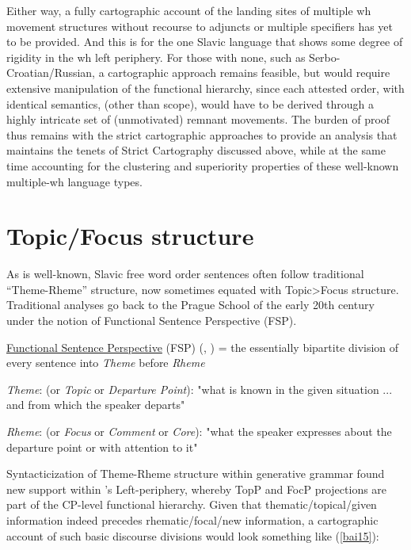 \documentclass[output=paper,colorlinks,citecolor=brown,
]{langscibook}
\begin{document}
Either way, a fully cartographic account of the landing sites of multiple wh movement structures without recourse to adjuncts or multiple specifiers has yet to be provided.  And this is for the one Slavic language that shows some degree of rigidity in the wh left periphery. For those with none, such as Serbo-Croatian/Russian, a cartographic approach remains feasible, but would require extensive manipulation of the functional hierarchy, since each attested order, with identical semantics, (other than scope), would have to be derived through a highly intricate set of (unmotivated) remnant movements. The burden of proof thus remains with the strict cartographic approaches to provide an analysis that maintains the tenets of Strict Cartography discussed above, while at the same time accounting for the clustering and superiority properties of these well-known multiple-wh language types.

\section{Topic/Focus structure}

As is well-known, Slavic free word order sentences often follow traditional “Theme-Rheme” structure, now sometimes equated with Topic>Focus structure. Traditional analyses go back to the Prague School of the early 20th century under the notion of Functional Sentence Perspective (FSP). 

\begin{exe} 
\ex \label{bai14}
\begin{xlist}

\ex \label{bai14a}
\uline{Functional Sentence Perspective} (FSP) (\citealt{Mathesius1939}, \citealt{Adamec1966}) = the essentially bipartite division of every sentence into \emph{Theme} before \emph{Rheme}

\ex \label{bai14b}
\emph{Theme}:  (or \emph{Topic} or \emph{Departure Point}):  "what is known in   the given situation ... and from which the speaker departs"

\ex \label{bai14c}
\emph{Rheme}:  (or \emph{Focus} or \emph{Comment} or \emph{Core}):  "what the speaker expresses about the departure point or with attention to it"

\end{xlist}
\end{exe}

Syntacticization of Theme-Rheme structure within generative grammar found new support within \citeauthor{Rizzi1997}’s \citeyear{Rizzi1997} Left-periphery, whereby TopP and FocP projections are part of the CP-level functional hierarchy. Given that thematic/topical/given information indeed precedes rhematic/focal/new information, a cartographic account of such basic discourse divisions would look something like (\ref{bai15}):
\end{document}
